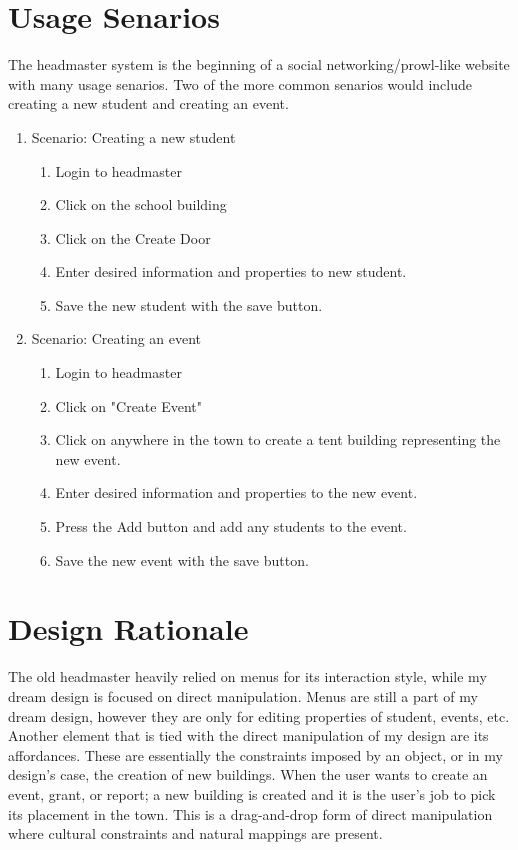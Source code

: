 \documentclass[11pt]{article}
\begin{document}
\section{Usage Senarios}
The headmaster system is the beginning of a social networking/prowl-like website with many usage senarios. Two of the more common senarios would include creating a new student and creating an event.
\begin{enumerate}
    \item Scenario: Creating a new student
  \begin{enumerate}
        \item Login to headmaster
        \item Click on the school building
        \item Click on the Create Door
        \item Enter desired information and properties to new student.
        \item Save the new student with the save button.
  \end{enumerate}
    \item Scenario: Creating an event
  \begin{enumerate}
        \item Login to headmaster
        \item Click on "Create Event"
        \item Click on anywhere in the town to create a tent building representing the new event.
        \item Enter desired information and properties to the new event.
        \item Press the Add button and add any students to the event.
        \item Save the new event with the save button.
  \end{enumerate}
\end{enumerate}

\section{Design Rationale}
The old headmaster heavily relied on menus for its interaction style, while my dream design is focused on direct manipulation. Menus are still a part of my dream design, however they are only for editing properties of student, events, etc. Another element that is tied with the direct manipulation of my design are its affordances. These are essentially the constraints imposed by an object, or in my design's case, the creation of new buildings. When the user wants to create an event, grant, or report; a new building is created and it is the user's job to pick its placement in the town. This is a drag-and-drop form of direct manipulation where cultural constraints and natural mappings are present. 
\end{document}
